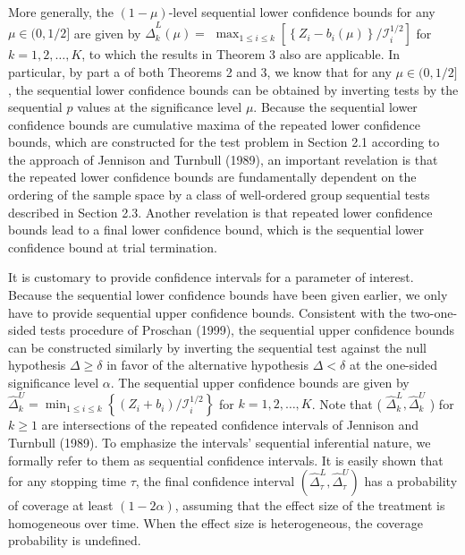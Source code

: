 \documentclass[10pt]{article}
\begin{document}
More generally, the $(1-\mu)$-level sequential lower confidence bounds for any $\mu \in(0,1 / 2]$ are given by $\hat{\Delta}_{k}^{L}(\mu)=$ $\max _{1 \leq i \leq k}\left[\left\{Z_{i}-b_{i}(\mu)\right\} / \mathcal{I}_{i}^{1 / 2}\right]$ for $k=1,2, \ldots, K$, to which the results in Theorem 3 also are applicable. In particular, by part a of both Theorems 2 and 3, we know that for any $\mu \in(0,1 / 2]$, the sequential lower confidence bounds can be obtained by inverting tests by the sequential $p$ values at the significance level $\mu$. Because the sequential lower confidence bounds are cumulative maxima of the repeated lower confidence bounds, which are constructed for the test problem in Section 2.1 according to the approach of Jennison and Turnbull (1989), an important revelation is that the repeated lower confidence bounds are fundamentally dependent on the ordering of the sample space by a class of well-ordered group sequential tests described in Section 2.3. Another revelation is that repeated lower confidence bounds lead to a final lower confidence bound, which is the sequential lower confidence bound at trial termination.

It is customary to provide confidence intervals for a parameter of interest. Because the sequential lower confidence bounds have been given earlier, we only have to provide sequential upper confidence bounds. Consistent with the two-one-sided tests procedure of Proschan (1999), the sequential upper confidence bounds can be constructed similarly by inverting the sequential test against the null hypothesis $\Delta \geq \delta$ in favor of the alternative hypothesis $\Delta<\delta$ at the one-sided significance level $\alpha$. The sequential upper confidence bounds are given by $\hat{\Delta}_{k}^{U}=\min _{1 \leq i \leq k}\left\{\left(Z_{i}+b_{i}\right) / \mathcal{I}_{i}^{1 / 2}\right\}$ for $k=1,2, \ldots, K$. Note that ( $\hat{\Delta}_{k}^{L}, \hat{\Delta}_{k}^{U}$ ) for $k \geq 1$ are intersections of the repeated confidence intervals of Jennison and Turnbull (1989). To emphasize the intervals' sequential inferential nature, we formally refer to them as sequential confidence intervals. It is easily shown that for any stopping time $\tau$, the final confidence interval $\left(\hat{\Delta}_{\tau}^{L}, \hat{\Delta}_{\tau}^{U}\right)$ has a probability of coverage at least $(1-2 \alpha)$, assuming that the effect size of the treatment is homogeneous over time. When the effect size is heterogeneous, the coverage probability is undefined.
\end{document}
